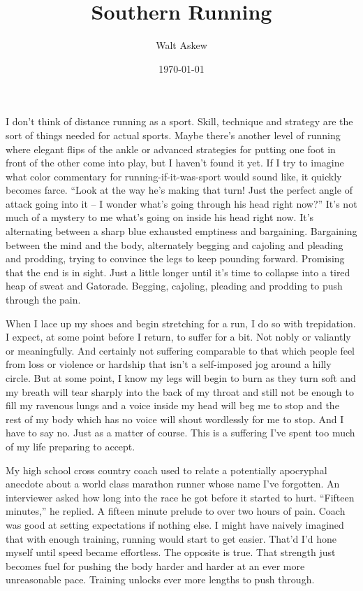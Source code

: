 \documentclass[12pt, oneside]{memoir}
\title{Southern Running}
\author{Walt Askew}
\date{\today}
\begin{document}
\maketitle

I don't think of distance running as a sport.
Skill, technique and strategy are the sort of things needed for
actual sports.
Maybe there's another level of running where elegant flips of the
ankle or advanced strategies for putting one foot in front of the
other come into play, but I haven't found it yet.
If I try to imagine what color commentary for running-if-it-was-sport
would sound like, it quickly becomes farce.
``Look at the way he's making that turn! Just the perfect angle of
attack going into it -- I wonder what's going through his head right
now?''
It's not much of a mystery to me what's going on inside his head right
now. 
It's alternating between a sharp blue exhausted emptiness and
bargaining.
Bargaining between the mind and the body, alternately begging and
cajoling and pleading and prodding, trying to convince the legs to
keep pounding forward.
Promising that the end is in sight.
Just a little longer until it's time to collapse into a tired heap of
sweat and Gatorade. 
Begging, cajoling, pleading and prodding to push through the pain.

When I lace up my shoes and begin stretching for a run, I do so with
trepidation.
I expect, at some point before I return, to suffer for a bit.
Not nobly or valiantly or meaningfully.
And certainly not suffering comparable to that which people feel from
loss or violence or hardship that isn't a self-imposed jog around a
hilly circle.
But at some point, I know my legs will begin to burn as they turn
soft and my breath will tear sharply into the back of my throat and
still not be enough to fill my ravenous lungs and a voice inside my
head will beg me to stop and the rest of my body which has no voice
will shout wordlessly for me to stop.
And I have to say no.
Just as a matter of course.
This is a suffering I've spent too much of my life preparing to
accept.

My high school cross country coach used to relate a potentially
apocryphal anecdote about a world class marathon runner whose name
I've forgotten.
An interviewer asked how long into the race he got before it started
to hurt.
``Fifteen minutes,'' he replied.
A fifteen minute prelude to over two hours of pain.
Coach was good at setting expectations if nothing else.
I might have naively imagined that with enough training,
running would start to get easier.
That'd I'd hone myself until speed became effortless.
The opposite is true.
That strength just becomes fuel for pushing the body harder and harder
at an ever more unreasonable pace.
Training unlocks ever more lengths to push through.
\end{document}
